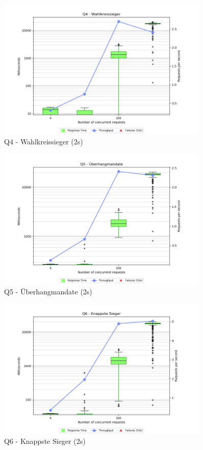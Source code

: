 \documentclass[a4paper]{scrreprt}
\begin{document}
\begin{figure}[htb!]
	\centering
	\includegraphics[width=0.9\textwidth]{images/plots_2s/Q4}
	\caption {Q4 - Wahlkreissieger (2s)}
\end{figure}

\begin{figure}[htb!]
	\centering
	\includegraphics[width=0.9\textwidth]{images/plots_2s/Q5}
	\caption {Q5 - Überhangmandate (2s)}
\end{figure}

\begin{figure}[htb!]
	\centering
	\includegraphics[width=0.9\textwidth]{images/plots_2s/Q6}
	\caption {Q6 - Knappste Sieger (2s)}
\end{figure}
\end{document}
